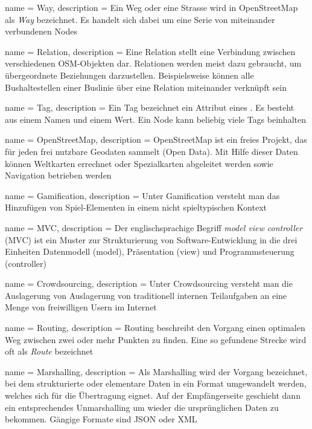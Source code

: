  {
	name = Way,
	description = {Ein Weg oder eine Strasse wird in OpenStreetMap als \emph{Way} bezeichnet. Es handelt sich dabei um eine Serie von miteinander verbundenen Nodes}
}

 {
	name = Relation,
	description = {Eine Relation stellt eine Verbindung zwischen verschiedenen OSM-Objekten dar. Relationen werden meist dazu gebraucht, um übergeordnete Beziehungen darzustellen. Beispielsweise können alle Bushaltestellen einer Buslinie über eine Relation miteinander verknüpft sein}
}

 {
	name = Tag,
	description = {Ein Tag bezeichnet ein Attribut eines . Es besteht aus einem Namen und einem Wert. Ein \gls{Node} kann beliebig viele Tags beinhalten}
}

 {
	name = OpenStreetMap,
	description = {OpenStreetMap ist ein freies Projekt, das für jeden frei nutzbare Geodaten sammelt (Open Data). Mit Hilfe dieser Daten können Weltkarten errechnet oder Spezialkarten abgeleitet werden sowie Navigation betrieben werden}
}

 {
	name = Gamification,
	description = {Unter Gamification versteht man das Hinzufügen von Spiel-Elementen in einem nicht spieltypischen Kontext}
}

 {
	name = MVC,
	description = {Der englischsprachige Begriff \emph{model view controller} (MVC) ist ein Muster zur Strukturierung von Software-Entwicklung in die drei Einheiten Datenmodell (model), Präsentation (view) und Programmsteuerung (controller)\cite{patterns}}
}

 {
	name = Crowdsourcing,
	description = {Unter Crowdsourcing versteht man die Auslagerung von  Auslagerung von traditionell internen Teilaufgaben an eine Menge von freiwilligen Usern im Internet\cite{crowdsourcing}}
}

 {
	name = Routing,
	description = {Routing beschreibt den Vorgang einen optimalen Weg zwischen zwei oder mehr Punkten zu finden. Eine so gefundene Strecke wird oft als \emph{Route} bezeichnet}
}

 {
	name = Marshalling,
	description = {Als Marshalling wird der Vorgang bezeichnet, bei dem strukturierte oder elementare Daten in ein Format umgewandelt werden, welches sich für die Übertragung eignet\cite{marshalling}. Auf der Empfängerseite geschieht dann ein entsprechendes Unmarshalling um wieder die ursprünglichen Daten zu bekommen.
Gängige Formate sind JSON oder XML}
}